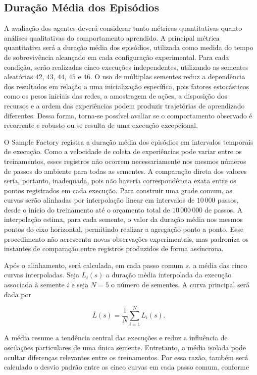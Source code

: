 \subsection{Duração Média dos Episódios}

A avaliação dos agentes deverá considerar tanto métricas quantitativas quanto análises qualitativas do comportamento aprendido. A principal métrica quantitativa será a duração média dos episódios, utilizada como medida do tempo de sobrevivência alcançado em cada configuração experimental. Para cada condição, serão realizadas cinco execuções independentes, utilizando as sementes aleatórias $42$, $43$, $44$, $45$ e $46$. O uso de múltiplas sementes reduz a dependência dos resultados em relação a uma inicialização específica, pois fatores estocásticos como os pesos iniciais das redes, a amostragem de ações, a disposição dos recursos e a ordem das experiências podem produzir trajetórias de aprendizado diferentes. Dessa forma, torna-se possível avaliar se o comportamento observado é recorrente e robusto ou se resulta de uma execução excepcional.

O Sample Factory registra a duração média dos episódios em intervalos temporais de execução. Como a velocidade de coleta de experiências pode variar entre os treinamentos, esses registros não ocorrem necessariamente nos mesmos números de passos do ambiente para todas as sementes. A comparação direta dos valores seria, portanto, inadequada, pois não haveria correspondência exata entre os pontos registrados em cada execução. Para construir uma grade comum, as curvas serão alinhadas por interpolação linear em intervalos de $10\,000$ passos, desde o início do treinamento até o orçamento total de $10\,000\,000$ de passos. A interpolação estima, para cada semente, o valor da duração média nos mesmos pontos do eixo horizontal, permitindo realizar a agregação ponto a ponto. Esse procedimento não acrescenta novas observações experimentais, mas padroniza os instantes de comparação entre registros produzidos de forma assíncrona.

Após o alinhamento, será calculada, em cada passo comum $s$, a média das cinco curvas interpoladas. Seja $L_i(s)$ a duração média interpolada da execução associada à semente $i$ e seja $N=5$ o número de sementes. A curva principal será dada por

$$
    \overline{L}(s) = \frac{1}{N}\sum_{i=1}^{N} L_i(s).
$$

A média resume a tendência central das execuções e reduz a influência de oscilações particulares de uma única semente. Entretanto, a média isolada pode ocultar diferenças relevantes entre os treinamentos. Por essa razão, também será calculado o desvio padrão entre as cinco curvas em cada passo comum, conforme

